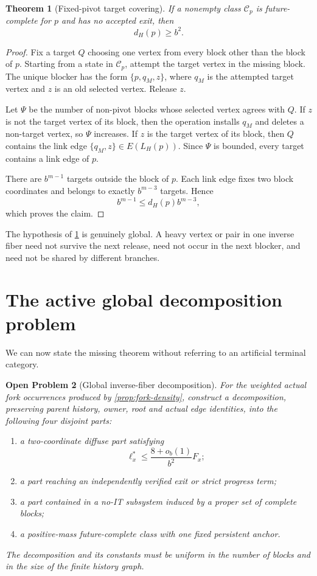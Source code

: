 \documentclass[11pt]{article}
\newtheorem{theorem}{Theorem}[section]
\newtheorem{problem}[theorem]{Open Problem}
\begin{document}
\begin{theorem}[Fixed-pivot target covering]\label{thm:anchor}
If a nonempty class \(\mathcal C_p\) is future-complete for \(p\) and has no
accepted exit, then
\[
  d_H(p)\ge b^2.
\]
\end{theorem}

\begin{proof}
Fix a target \(Q\) choosing one vertex from every block other than the block of
\(p\).  Starting from a state in \(\mathcal C_p\), attempt the target vertex in
the missing block.  The unique blocker has the form
\(\{p,q_M,z\}\), where \(q_M\) is the attempted target vertex and \(z\) is an
old selected vertex.  Release \(z\).

Let \(\Psi\) be the number of non-pivot blocks whose selected vertex agrees
with \(Q\).  If \(z\) is not the target vertex of its block, then the operation
installs \(q_M\) and deletes a non-target vertex, so \(\Psi\) increases.  If
\(z\) is the target vertex of its block, then \(Q\) contains the link edge
\(\{q_M,z\}\in E(L_H(p))\).  Since \(\Psi\) is bounded, every target contains a
link edge of \(p\).

There are \(b^{m-1}\) targets outside the block of \(p\).  Each link edge fixes
two block coordinates and belongs to exactly \(b^{m-3}\) targets.  Hence
\[
  b^{m-1}\le d_H(p)b^{m-3},
\]
which proves the claim.
\end{proof}

The hypothesis of \cref{thm:anchor} is genuinely global.  A heavy vertex or
pair in one inverse fiber need not survive the next release, need not occur in
the next blocker, and need not be shared by different branches.

\section{The active global decomposition problem}

We can now state the missing theorem without referring to an artificial
terminal category.

\begin{problem}[Global inverse-fiber decomposition]\label{prob:global-fiber}
For the weighted actual fork occurrences produced by
\cref{prop:fork-density}, construct a decomposition, preserving parent history,
owner, root and actual edge identities, into the following four disjoint parts:
\begin{enumerate}[label=(\roman*)]
\item a two-coordinate diffuse part satisfying
\[
  \ell_x^*\le\frac{8+o_b(1)}{b^2}F_x;
\]
\item a part reaching an independently verified exit or strict progress term;
\item a part contained in a no-IT subsystem induced by a proper set of complete
blocks;
\item a positive-mass future-complete class with one fixed persistent anchor.
\end{enumerate}
The decomposition and its constants must be uniform in the number of blocks and
in the size of the finite history graph.
\end{problem}
\end{document}
